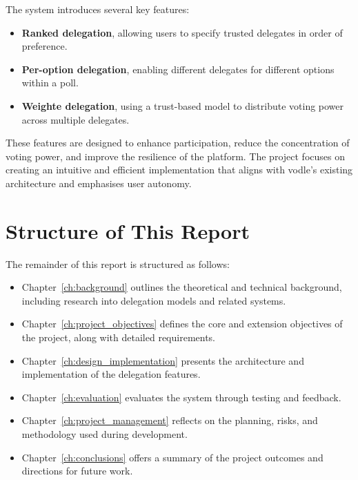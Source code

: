 The system introduces several key features:
\begin{itemize}
  \item \textbf{Ranked delegation}, allowing users to specify trusted delegates in order of preference.
  \item \textbf{Per-option delegation}, enabling different delegates for different options within a poll.
  \item \textbf{Weighte delegation}, using a trust-based model to distribute voting power across multiple delegates.
\end{itemize}

These features are designed to enhance participation, reduce the concentration of voting power, and improve the resilience of the platform. The project focuses on creating an intuitive and efficient implementation that aligns with vodle's existing architecture and emphasises user autonomy.

\section{Structure of This Report}

The remainder of this report is structured as follows:

\begin{itemize}
  \item Chapter~\ref{ch:background} outlines the theoretical and technical background, including research into delegation models and related systems.
  \item Chapter~\ref{ch:project_objectives} defines the core and extension objectives of the project, along with detailed requirements.
  \item Chapter~\ref{ch:design_implementation} presents the architecture and implementation of the delegation features.
  \item Chapter~\ref{ch:evaluation} evaluates the system through testing and feedback.
  \item Chapter~\ref{ch:project_management} reflects on the planning, risks, and methodology used during development.
  \item Chapter~\ref{ch:conclusions} offers a summary of the project outcomes and directions for future work.
\end{itemize}